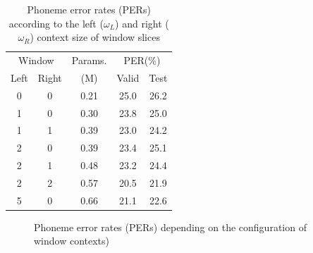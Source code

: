 \documentclass[review]{elsarticle}
\begin{document}
\begin{table}[]
\centering
\begin{tabular}{cc|c|cc}
\multicolumn{2}{c|}{Window} & Params. & \multicolumn{2}{c}{PER(\%)} \\ 
Left & Right &  (M) & Valid & Test \\\hline
0 & 0 & 0.21 & 25.0 & 26.2 \\
1 & 0 & 0.30 & 23.8 & 25.0 \\
1 & 1 & 0.39 & 23.0 & 24.2 \\
2 & 0 & 0.39 & 23.4 & 25.1 \\
2 & 1 & 0.48 & 23.2 & 24.4 \\
2 & 2 & 0.57 & 20.5 & 21.9 \\
5 & 0 & 0.66 & 21.1 & 22.6
\end{tabular}
\caption{Phoneme error rates (PERs) according to the left ($\omega_L$) and right ($\omega_R$) context size of window slices}
\label{Tab:window}
\end{table}

\begin{figure}[ht]
\centering
{}
\qquad
{}
\caption[]{Phoneme error rates (PERs) depending on the configuration of window contexts)}
\label{fig:diagram_window}
\end{figure}
\end{document}
